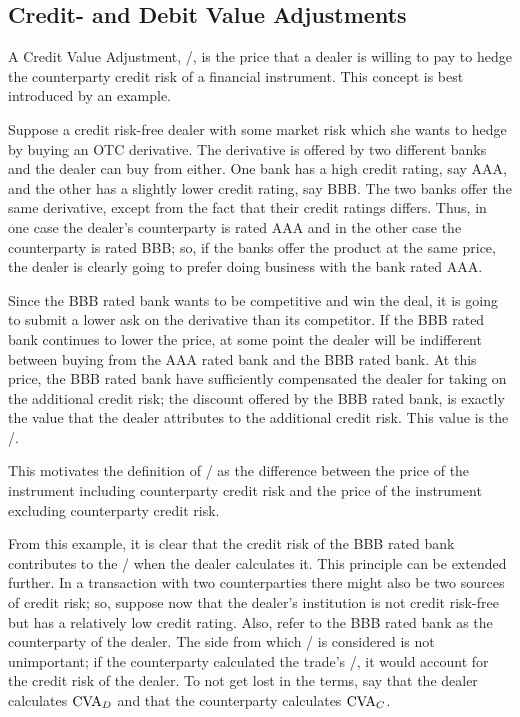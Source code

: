 \documentclass[main.tex]{subfiles}
\begin{document}
    \subsection{Credit- and Debit Value Adjustments}
        A Credit Value Adjustment, \CVA/, is the price that a dealer is willing to pay 
        to hedge the counterparty credit risk of a financial instrument.
        This concept is best introduced by an example. 
        
        \begin{example}
        Suppose a credit risk-free dealer with some market risk 
        which she wants to hedge by buying an OTC derivative.
        The derivative is offered by two different banks and the dealer can buy from either.
        One bank has a high credit rating, say AAA, and the other has a slightly lower credit rating, say BBB. 
        The two banks offer the same derivative, except from the fact that their credit ratings differs.
        Thus, in one case the dealer's counterparty is rated AAA and in the other case the counterparty is rated BBB;
        so, if the banks offer the product at the same price, 
        the dealer is clearly going to prefer doing business with the bank rated AAA.

        Since the BBB rated bank wants to be competitive and win the deal,
        it is going to submit a lower ask on the derivative than its competitor.
        If the BBB rated bank continues to lower the price, 
        at some point the dealer will be indifferent between buying 
        from the AAA rated bank and the BBB rated bank.
        At this price, the BBB rated bank have sufficiently compensated the dealer for taking on the additional credit risk;
        the discount offered by the BBB rated bank, 
        is exactly the value that the dealer attributes to the additional credit risk. 
        This value is the \CVA/.

        This motivates the definition of \CVA/ as the difference between the price of the instrument 
        including counterparty credit risk and the price of the instrument excluding counterparty credit risk.
        \end{example}

        From this example, it is clear that the credit risk of the BBB rated bank contributes to the \CVA/
        when the dealer calculates it.
        This principle can be extended further.
        In a transaction with two counterparties there might also be two sources of credit risk;
        so, suppose now that the dealer's institution is not credit risk-free 
        but has a relatively low credit rating.
        Also, refer to the BBB rated bank as the counterparty of the dealer.
        The side from which \CVA/ is considered is not unimportant;
        if the counterparty calculated the trade's \CVA/, it would account for the credit risk of the dealer.
        To not get lost in the terms, say that the dealer calculates $\CVA/_{D}$ 
        and that the counterparty calculates $\CVA/_{C}$.
\end{document}
